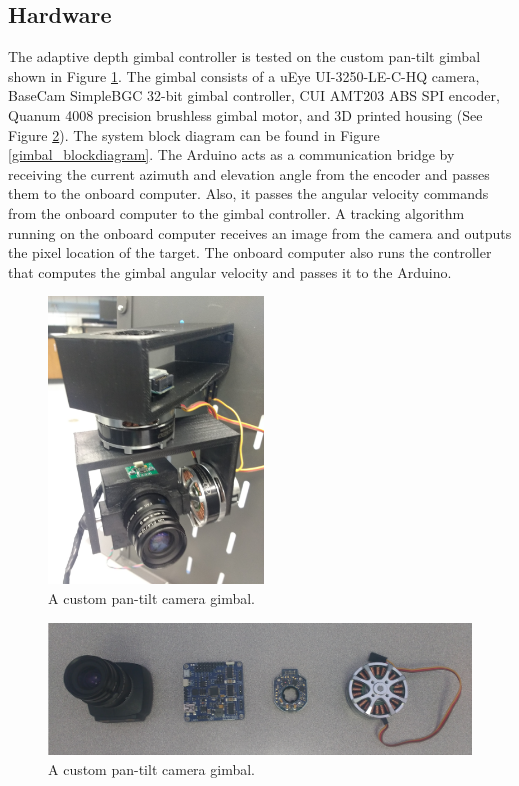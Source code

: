 \subsection{Hardware}
The adaptive depth gimbal controller is tested on the custom pan-tilt gimbal shown in Figure \ref{gimbal}. The gimbal consists of a uEye UI-3250-LE-C-HQ camera, BaseCam SimpleBGC 32-bit gimbal controller, CUI AMT203 ABS SPI encoder, Quanum 4008 precision brushless gimbal motor, and 3D printed housing (See Figure \ref{gimbal_parts}). The system block diagram can be found in Figure \ref{gimbal_blockdiagram}. The Arduino acts as a communication bridge by receiving the current azimuth and elevation angle from the encoder and passes them to the onboard computer. Also, it passes the angular velocity commands from the onboard computer to the gimbal controller. A tracking algorithm running on the onboard computer receives an image from the camera and outputs the pixel location of the target. The onboard computer also runs the controller that computes the gimbal angular velocity and passes it to the Arduino.
\begin{figure}[htbp]
	\centering
	\includegraphics[height = 3in]{images/chapter2/gimbal.jpg}
	\caption{A custom pan-tilt camera gimbal.}
	\label{gimbal}
\end{figure}
\begin{figure}[htbp]
	\centering
	\includegraphics[width=0.8\linewidth]{images/chapter2/gimbal_parts.png}
	\caption{A custom pan-tilt camera gimbal.}
	\label{gimbal_parts}
\end{figure}
